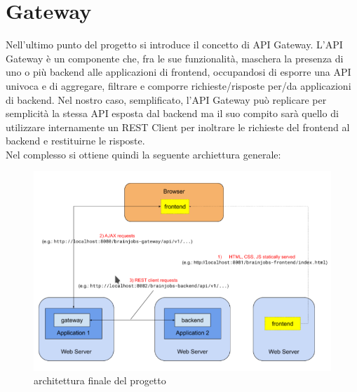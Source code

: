 \documentclass[a4paper,12pt, oneside]{book}
\begin{document}
\chapter{Gateway}
Nell'ultimo punto del progetto si introduce il concetto di API Gateway. L’API Gateway è un componente che, fra le sue funzionalità, maschera la presenza di uno o
più backend alle applicazioni di frontend, occupandosi di esporre una API univoca e di
aggregare, filtrare e comporre richieste/risposte per/da applicazioni di backend.
Nel nostro caso, semplificato, l’API Gateway può replicare per semplicità la stessa API esposta dal
backend ma il suo compito sarà quello di utilizzare internamente un REST Client per
inoltrare le richieste del frontend al backend e restituirne le risposte.\\
Nel complesso si ottiene quindi la seguente archiettura generale:
\begin{figure}[h!]
  \centering
  \includegraphics[scale = 0.68]{img/arch.png}
  \caption{architettura finale del progetto}
\end{figure}
\end{document}
